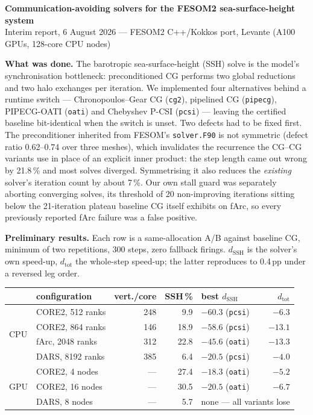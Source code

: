 \documentclass[10pt,a4paper]{article}
\begin{document}
{\large\bfseries Communication-avoiding solvers for the FESOM2 sea-surface-height system}\\[1pt]
{\small Interim report, 6 August 2026 --- FESOM2 C++/Kokkos port, Levante (A100 GPUs, 128-core CPU nodes)}

\textbf{What was done.}
The barotropic sea-surface-height (SSH) solve is the model's synchronisation bottleneck:
preconditioned CG performs two global reductions and two halo exchanges per iteration. We
implemented four alternatives behind a runtime switch --- Chronopoulos--Gear CG
(\texttt{cg2}), pipelined CG (\texttt{pipecg}), PIPECG-OATI (\texttt{oati}) and Chebyshev
P-CSI (\texttt{pcsi}) --- leaving the certified baseline bit-identical when the switch is
unset. Two defects had to be fixed first. The preconditioner inherited from FESOM's
\texttt{solver.F90} is not symmetric (defect ratio 0.62--0.74 over three meshes), which
invalidates the recurrence the CG--CG variants use in place of an explicit inner product: the
step length came out wrong by 21.8\,\% and most solves diverged. Symmetrising it also reduces
the \emph{existing} solver's iteration count by about 7\,\%. Our own stall guard was
separately aborting converging solves, its threshold of 20 non-improving iterations sitting
below the 21-iteration plateau baseline CG itself exhibits on fArc, so every previously
reported fArc failure was a false positive.

\textbf{Preliminary results.}
Each row is a same-allocation A/B against baseline CG, minimum of two repetitions, 300 steps,
zero fallback firings. $d_{\mathrm{SSH}}$ is the solver's own speed-up, $d_{\mathrm{tot}}$ the
whole-step speed-up; the latter reproduces to 0.4\,pp under a reversed leg order.

\begin{center}\footnotesize\setlength{\tabcolsep}{5pt}
\begin{tabular}{llrrlr}
\toprule
& configuration & vert./core & SSH\,\% & best $d_{\mathrm{SSH}}$ & $d_{\mathrm{tot}}$ \\
\midrule
\multirow{4}{*}{CPU}
& CORE2, 512 ranks & 248 & 9.9 & $-60.3$ (\texttt{pcsi}) & $-6.3$ \\
& CORE2, 864 ranks & 146 & 18.9 & $-58.6$ (\texttt{pcsi}) & $-13.1$ \\
& fArc, 2048 ranks & 312 & 22.8 & $-45.6$ (\texttt{oati}) & $-13.3$ \\
& DARS, 8192 ranks & 385 & 6.4 & $-20.5$ (\texttt{pcsi}) & $-4.0$ \\
\midrule
\multirow{3}{*}{GPU}
& CORE2, 4 nodes & --- & 27.4 & $-18.3$ (\texttt{oati}) & $-5.2$ \\
& CORE2, 16 nodes & --- & 30.5 & $-20.5$ (\texttt{oati}) & $-6.7$ \\
& DARS, 8 nodes & --- & 5.7 & \multicolumn{2}{l}{none --- all variants lose} \\
\bottomrule
\end{tabular}
\end{center}
\end{document}
